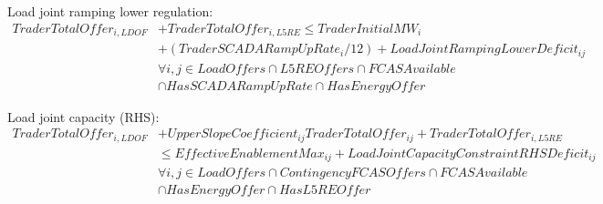 \documentclass{article}
\begin{document}
%
%
%
%
%

Load joint ramping lower regulation:
\begin{equation}
\begin{split}
TraderTotalOffer_{i,LDOF} & + TraderTotalOffer_{i,L5RE} \leq TraderInitialMW_{i} \\
& + (TraderSCADARampUpRate_{i} / 12) + LoadJointRampingLowerDeficit_{ij} \\
& \forall i,j \in LoadOffers \cap L5REOffers \cap FCASAvailable \\
& \cap HasSCADARampUpRate \cap HasEnergyOffer
\end{split}
\end{equation}

%
%
%
%
%

Load joint capacity (RHS):
\begin{equation}
\begin{split}
TraderTotalOffer_{i,LDOF} & + UpperSlopeCoefficient_{ij} TraderTotalOffer_{ij} + TraderTotalOffer_{i,L5RE} \\
& \leq EffectiveEnablementMax_{ij} + LoadJointCapacityConstraintRHSDeficit_{ij} \\
& \forall i,j \in LoadOffers \cap ContingencyFCASOffers \cap FCASAvailable \\
& \cap HasEnergyOffer \cap HasL5REOffer
\end{split}
\end{equation}
\end{document}
